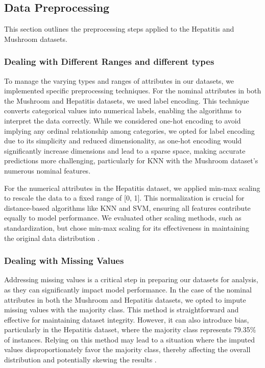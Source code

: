 \subsection{Data Preprocessing}
\label{subsec:preprocessing}

This section outlines the preprocessing steps applied to the Hepatitis and Mushroom datasets.

\subsubsection{Dealing with Different Ranges and different types}
To manage the varying types and ranges of attributes in our datasets, we implemented specific preprocessing techniques.
For the nominal attributes in both the Mushroom and Hepatitis datasets, we used label encoding.
This technique converts categorical values into numerical labels, enabling the algorithms to interpret the data correctly.
While we considered one-hot encoding to avoid implying any ordinal relationship among categories, we opted for label encoding due to its simplicity and reduced dimensionality, as one-hot encoding would significantly increase dimensions and lead to a sparse space, making accurate predictions more challenging, particularly for KNN with the Mushroom dataset's numerous nominal features.

For the numerical attributes in the Hepatitis dataset, we applied min-max scaling to rescale the data to a fixed range of [0, 1]. This normalization is crucial for distance-based algorithms like KNN and SVM, ensuring all features contribute equally to model performance.
We evaluated other scaling methods, such as standardization, but chose min-max scaling for its effectiveness in maintaining the original data distribution \cite{data_cleaning}.

\subsubsection{Dealing with Missing Values}
Addressing missing values is a critical step in preparing our datasets for analysis, as they can significantly impact model performance.
In the case of the nominal attributes in both the Mushroom and Hepatitis datasets, we opted to impute missing values with the majority class.
This method is straightforward and effective for maintaining dataset integrity.
However, it can also introduce bias, particularly in the Hepatitis dataset, where the majority class represents 79.35\% of instances.
Relying on this method may lead to a situation where the imputed values disproportionately favor the majority class, thereby affecting the overall distribution
and potentially skewing the results \cite{data_cleaning}.


